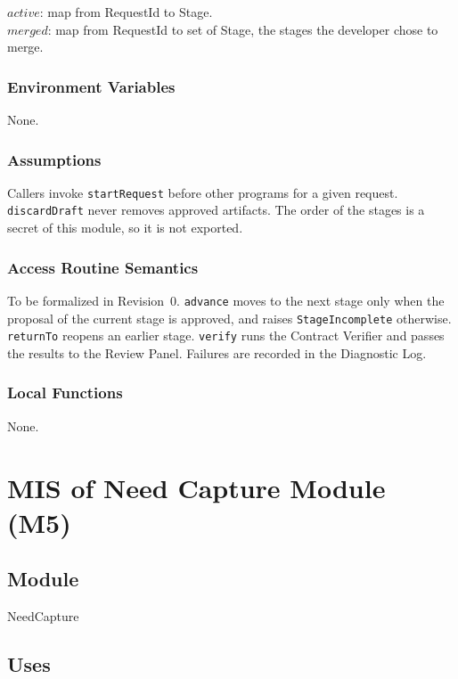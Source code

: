 \documentclass[12pt, titlepage]{article}
\begin{document}
$active$: map from RequestId to Stage.\\
$merged$: map from RequestId to set of Stage, the stages the developer chose to
merge.

\subsubsection{Environment Variables}

None.

\subsubsection{Assumptions}

Callers invoke \texttt{startRequest} before other programs for a given
request. \texttt{discardDraft} never removes approved artifacts. The order of the
stages is a secret of this module, so it is not exported.

\subsubsection{Access Routine Semantics}

To be formalized in Revision~0. \texttt{advance} moves to the next stage only
when the proposal of the current stage is approved, and raises
\texttt{StageIncomplete} otherwise. \texttt{returnTo} reopens an earlier stage.
\texttt{verify} runs the Contract Verifier and passes the results to the Review
Panel. Failures are recorded in the Diagnostic Log.

\subsubsection{Local Functions}

None.

\newpage
\section{MIS of Need Capture Module (M5)} \label{MISNeed}

\subsection{Module}

NeedCapture

\subsection{Uses}
\end{document}
